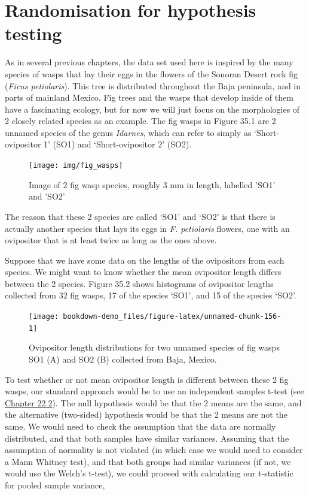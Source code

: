 \documentclass[
  openany]{scrbook}
\begin{document}
\hypertarget{randomisation-for-hypothesis-testing}{%
\section{Randomisation for hypothesis testing}\label{randomisation-for-hypothesis-testing}}

As in several previous chapters, the data set used here is inspired by the many species of wasps that lay their eggs in the flowers of the Sonoran Desert rock fig (\emph{Ficus petiolaris}).
This tree is distributed throughout the Baja peninsula, and in parts of mainland Mexico.
Fig trees and the wasps that develop inside of them have a fascinating ecology, but for now we will just focus on the morphologies of 2 closely related species as an example.
The fig wasps in Figure 35.1 are 2 unnamed species of the genus \emph{Idarnes}, which can refer to simply as `Short-ovipositor 1' (SO1) and `Short-ovipositor 2' (SO2).

\begin{figure}
\texttt{[image: img/fig\_wasps]} \caption{Image of 2 fig wasp species, roughly 3 mm in length, labelled 'SO1' and 'SO2'}\label{fig:unnamed-chunk-155}
\end{figure}

The reason that these 2 species are called `SO1' and `SO2' is that there is actually another species that lays its eggs in \emph{F. petiolaris} flowers, one with an ovipositor that is at least twice as long as the ones above.

Suppose that we have some data on the lengths of the ovipositors from each species.
We might want to know whether the mean ovipositor length differs between the 2 species. Figure 35.2 shows histograms of ovipositor lengths collected from 32 fig wasps, 17 of the species `SO1', and 15 of the species `SO2'.

\begin{figure}
\texttt{[image: bookdown-demo\_files/figure-latex/unnamed-chunk-156-1]} \caption{Ovipositor length distributions for two unnamed species of fig wasps SO1 (A) and SO2 (B) collected from Baja, Mexico.}\label{fig:unnamed-chunk-156}
\end{figure}

To test whether or not mean ovipositor length is different between these 2 fig wasps, our standard approach would be to use an independent samples t-test (see \protect\hyperlink{independent-samples-t-test}{Chapter 22.2}).
The null hypothesis would be that the 2 means are the same, and the alternative (two-sided) hypothesis would be that the 2 means are not the same.
We would need to check the assumption that the data are normally distributed, and that both samples have similar variances.
Assuming that the assumption of normality is not violated (in which case we would need to consider a Mann Whitney test), and that both groups had similar variances (if not, we would use the Welch's t-test), we could proceed with calculating our t-statistic for pooled sample variance,
\end{document}
